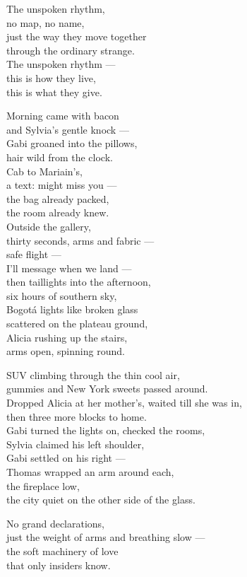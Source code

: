 \begin{lyrics}
The unspoken rhythm,\\
no map, no name,\\
just the way they move together\\
through the ordinary strange.\\
The unspoken rhythm —\\
this is how they live,\\
this is what they give.

Morning came with bacon\\
and Sylvia's gentle knock —\\
Gabi groaned into the pillows,\\
hair wild from the clock.\\
Cab to Mariain's,\\
a text: might miss you —\\
the bag already packed,\\
the room already knew.\\
Outside the gallery,\\
thirty seconds, arms and fabric —\\
safe flight —\\
I'll message when we land —\\
then taillights into the afternoon,\\
six hours of southern sky,\\
Bogotá lights like broken glass\\
scattered on the plateau ground,\\
Alicia rushing up the stairs,\\
arms open, spinning round.

SUV climbing through the thin cool air,\\
gummies and New York sweets passed around.\\
Dropped Alicia at her mother's, waited till she was in,\\
then three more blocks to home.\\
Gabi turned the lights on, checked the rooms,\\
Sylvia claimed his left shoulder,\\
Gabi settled on his right —\\
Thomas wrapped an arm around each,\\
the fireplace low,\\
the city quiet on the other side of the glass.

No grand declarations,\\
just the weight of arms and breathing slow —\\
the soft machinery of love\\
that only insiders know.


\end{lyrics}
